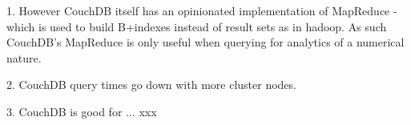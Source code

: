 1. However CouchDB itself has an opinionated implementation of MapReduce - which is used to build B+indexes instead of result sets as in hadoop. As such CouchDB's MapReduce is only useful when querying for analytics of a numerical nature.

2. CouchDB query times go down with more cluster nodes.

3. CouchDB is good for ... xxx